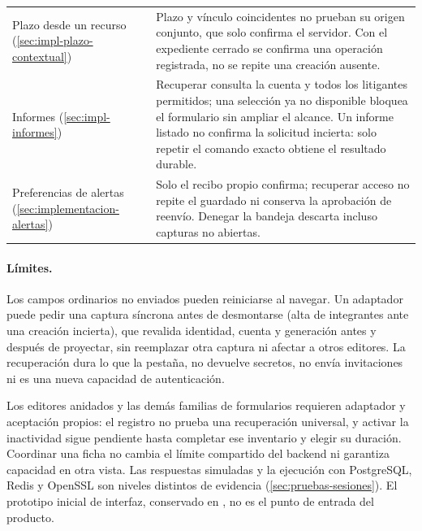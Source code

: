 \begin{longtable}{@{}L{2.9cm}L{\dimexpr\linewidth-2.9cm-2\tabcolsep\relax}@{}}
    Plazo desde un recurso (\cref{sec:impl-plazo-contextual}) & Plazo y vínculo coincidentes no prueban su origen conjunto, que solo confirma el servidor. Con el expediente cerrado se confirma una operación registrada, no se repite una creación ausente. \\
    Informes (\cref{sec:impl-informes}) & Recuperar consulta la cuenta y todos los litigantes permitidos; una selección ya no disponible bloquea el formulario sin ampliar el alcance. Un informe listado no confirma la solicitud incierta: solo repetir el comando exacto obtiene el resultado durable. \\
    Preferencias de alertas (\cref{sec:implementacion-alertas}) & Solo el recibo propio confirma; recuperar acceso no repite el guardado ni conserva la aprobación de reenvío. Denegar la bandeja descarta incluso capturas no abiertas. \\
\end{longtable}
\endgroup

\paragraph{Límites.} Los campos ordinarios no enviados pueden reiniciarse al navegar. Un adaptador puede pedir una captura síncrona antes de desmontarse (alta de integrantes ante una creación incierta), que revalida identidad, cuenta y generación antes y después de proyectar, sin reemplazar otra captura ni afectar a otros editores. La recuperación dura lo que la pestaña, no devuelve secretos, no envía invitaciones ni es una nueva capacidad de autenticación.\par Los editores anidados y las demás familias de formularios requieren adaptador y aceptación propios: el registro no prueba una recuperación universal, y activar la inactividad sigue pendiente hasta completar ese inventario y elegir su duración. Coordinar una ficha no cambia el límite compartido del backend ni garantiza capacidad en otra vista. Las respuestas simuladas y la ejecución con PostgreSQL, Redis y OpenSSL son niveles distintos de evidencia (\cref{sec:pruebas-sesiones}). El prototipo inicial de interfaz, conservado en , no es el punto de entrada del producto.

